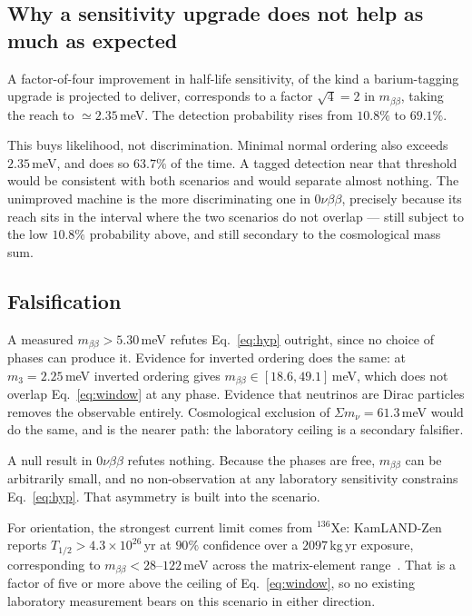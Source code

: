 \documentclass[aps,prd,twocolumn,superscriptaddress,nofootinbib,10pt]{revtex4-2}
\begin{document}
\subsection{Why a sensitivity upgrade does not help as much as expected}

A factor-of-four improvement in half-life sensitivity, of the kind a barium-tagging upgrade is
projected to deliver, corresponds to a factor $\sqrt{4} = 2$ in $m_{\beta\beta}$, taking the reach
to $\simeq 2.35\,$meV. The detection probability rises from $10.8\%$ to $69.1\%$.

This buys likelihood, not discrimination. Minimal normal ordering also exceeds $2.35\,$meV, and
does so $63.7\%$ of the time. A tagged detection near that threshold would be consistent with both
scenarios and would separate almost nothing. The unimproved machine is the more discriminating one
in $0\nu\beta\beta$, precisely because its reach sits in the interval where the two scenarios do not
overlap --- still subject to the low $10.8\%$ probability above, and still secondary to the
cosmological mass sum.

\subsection{Falsification}

A measured $m_{\beta\beta} > 5.30\,$meV refutes Eq.~\eqref{eq:hyp} outright, since no choice of
phases can produce it. Evidence for inverted ordering does the same: at $m_3 = 2.25\,$meV inverted
ordering gives $m_{\beta\beta} \in [18.6, 49.1]\,$meV, which does not overlap
Eq.~\eqref{eq:window} at any phase. Evidence that neutrinos are Dirac particles removes the
observable entirely. Cosmological exclusion of $\Sigma m_\nu = 61.3\,$meV would do the same, and
is the nearer path: the laboratory ceiling is a secondary falsifier.

A null result in $0\nu\beta\beta$ refutes nothing. Because the phases are free, $m_{\beta\beta}$ can
be arbitrarily small, and no non-observation at any laboratory sensitivity constrains
Eq.~\eqref{eq:hyp}. That asymmetry is built into the scenario.

For orientation, the strongest current limit comes from $^{136}$Xe: KamLAND-Zen reports
$T_{1/2} > 4.3 \times 10^{26}\,$yr at $90\%$ confidence over a $2097\,$kg\,yr exposure,
corresponding to $m_{\beta\beta} < 28$--$122\,$meV across the matrix-element
range~\cite{KamLANDZen2023}. That is a factor of five or more above the ceiling of
Eq.~\eqref{eq:window}, so no existing laboratory measurement bears on this scenario in either
direction.
\end{document}
